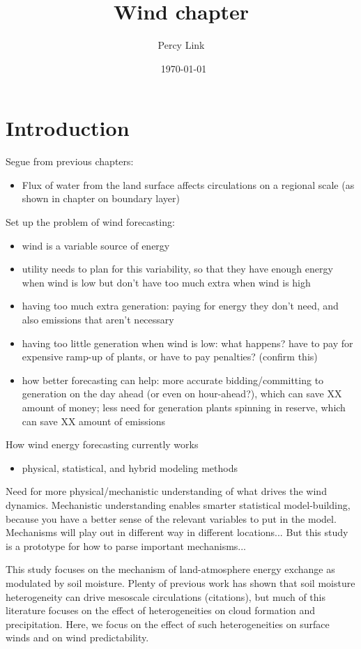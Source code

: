 \documentclass[12pt]{amsart}
\title{Wind chapter}
\author{Percy Link}
\date{\currenttime \ \today} %
\begin{document}
\maketitle

\section{Introduction}

Segue from previous chapters:
\begin{itemize}
\item Flux of water from the land surface affects circulations on a regional scale (as shown in chapter on boundary layer)
\end{itemize}

Set up the problem of wind forecasting:
\begin{itemize}
\item wind is a variable source of energy
\item utility needs to plan for this variability, so that they have enough energy when wind is low but don't have too much extra when wind is high
\item having too much extra generation: paying for energy they don't need, and also emissions that aren't necessary
\item having too little generation when wind is low: what happens?  have to pay for expensive ramp-up of plants, or have to pay penalties?  (confirm this)
\item how better forecasting can help: more accurate bidding/committing to generation on the day ahead (or even on hour-ahead?), which can save XX amount of money; less need for generation plants spinning in reserve, which can save XX amount of emissions
\end{itemize}

How wind energy forecasting currently works
\begin{itemize}
\item physical, statistical, and hybrid modeling methods
\end{itemize}

Need for more physical/mechanistic understanding of what drives the wind dynamics.  Mechanistic understanding enables smarter statistical model-building, because you have a better sense of the relevant variables to put in the model.  Mechanisms will play out in different way in different locations... But this study is a prototype for how to parse important mechanisms...

This study focuses on the mechanism of land-atmosphere energy exchange as modulated by soil moisture.  Plenty of previous work has shown that soil moisture heterogeneity can drive mesoscale circulations (citations), but much of this literature focuses on the effect of heterogeneities on cloud formation and precipitation.  Here, we focus on the effect of such heterogeneities on surface winds and on wind predictability.  
\end{document}
